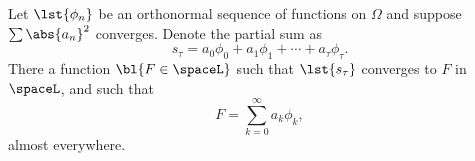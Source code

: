 % 

\begin{theorem}

Let $\lst{\phi_{n}}$ be an orthonormal sequence of functions on $\Omega$ and suppose $\sum \abs{a_{n}}^{2}$ converges. Denote the partial sum as
%
\begin{equation*}
	s_{\tau} = a_{0}\phi_{0} + a_{1}\phi_{1} + \cdots + a_{\tau}\phi_{\tau} .
\end{equation*}
%
There  a function $\bl{F\in\spaceL}$ such that $\lst{s_{\tau}}$ converges to $F$ in $\spaceL$, and such that
%
\begin{equation*}
	F = \sum_{k=0}^{\infty} a_{k}\phi_{k},
\end{equation*}
%
almost everywhere.

\label{thm:RieszFischer}
\end{theorem}
%

\endinput  %
